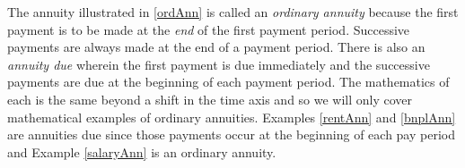 The annuity illustrated in \autoref{ordAnn} is called an \emph{ordinary annuity} because the first payment is to be made at the \emph{end} of the first payment period. Successive payments are always made at the end of a payment period. There is also an \emph{annuity due} wherein the first payment is due immediately and the successive payments are due at the beginning of each payment period. The mathematics of each is the same beyond a shift in the time axis and so we will only cover mathematical examples of ordinary annuities. Examples \ref{rentAnn} and \ref{bnplAnn} are annuities due since those payments occur at the beginning of each pay period and Example \ref{salaryAnn} is an ordinary annuity.